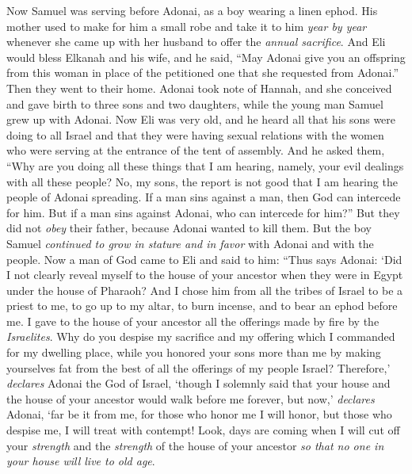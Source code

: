 \begin{biblechapter}
 Now Samuel was serving before Adonai, as a boy wearing a linen ephod.
\verse His mother used to make for him a small robe and take it to him \textit{year by year} whenever she came up with her husband to offer the \textit{annual sacrifice}.
\verse And Eli would bless Elkanah and his wife, and he said, “May Adonai give you an offspring from this woman in place of the petitioned one that she requested from Adonai.” Then they went to their home.
\verse Adonai took note of Hannah, and she conceived and gave birth to three sons and two daughters, while the young man Samuel grew up with Adonai.
 Now Eli was very old, and he heard all that his sons were doing to all Israel and that they were having sexual relations with the women who were serving at the entrance of the tent of assembly.
\verse And he asked them, “Why are you doing all these things that I am hearing, namely, your evil dealings with all these people?
\verse No, my sons, the report is not good that I am hearing the people of Adonai spreading.
\verse If a man sins against a man, then God can intercede for him. But if a man sins against Adonai, who can intercede for him?” But they did not \textit{obey} their father, because Adonai wanted to kill them.
\verse But the boy Samuel \textit{continued to grow in stature and in favor} with Adonai and with the people.
 Now a man of God came to Eli and said to him: “Thus says Adonai: ‘Did I not clearly reveal myself to the house of your ancestor when they were in Egypt under the house of Pharaoh?
\verse And I chose him from all the tribes of Israel to be a priest to me, to go up to my altar, to burn incense, and to bear an ephod before me. I gave to the house of your ancestor all the offerings made by fire by the \textit{Israelites}.
\verse Why do you despise my sacrifice and my offering which I commanded for my dwelling place, while you honored your sons more than me by making yourselves fat from the best of all the offerings of my people Israel?
\verse Therefore,’ \textit{declares} Adonai the God of Israel, ‘though I solemnly said that your house and the house of your ancestor would walk before me forever, but now,’ \textit{declares} Adonai, ‘far be it from me, for those who honor me I will honor, but those who despise me, I will treat with contempt!
\verse Look, days are coming when I will cut off your \textit{strength} and the \textit{strength} of the house of your ancestor \textit{so that no one in your house will live to old age}.

\end{biblechapter}
